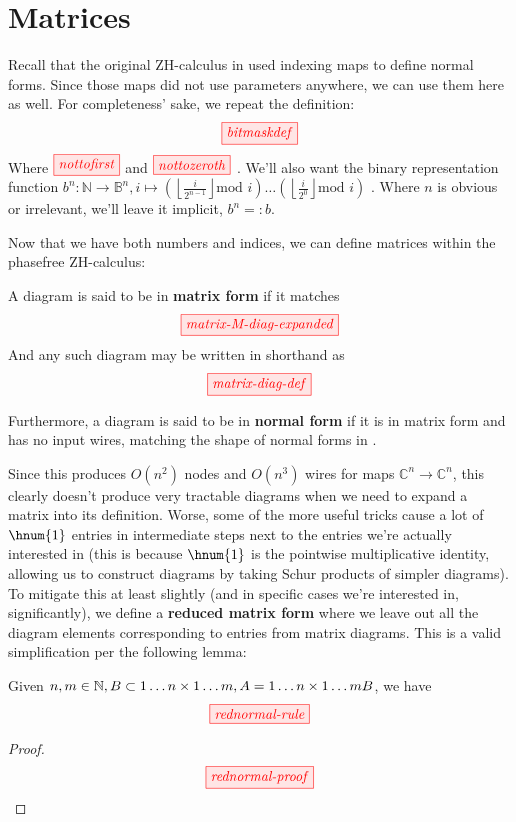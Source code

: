 \section{Matrices}\label{sec:matrices}
Recall that the original ZH-calculus in \cite{backens2018zhcalculus} used
indexing maps to define normal forms.  Since those maps did not use parameters
anywhere, we can use them here as well.  For completeness' sake, we repeat the
definition:
$$\tikzfig{bitmaskdef}$$
Where $\tikzfig{nottofirst}$ and $\tikzfig{nottozeroth}$ . We'll also want the
binary representation function 
$b^n : \mathbb{N} \rightarrow \mathbb{B}^n, i \mapsto \left( \left \lfloor
\frac{i}{2^{n-1}}\right \rfloor \text{mod } i \right) \ldots \left( \left \lfloor
\frac{i}{2^{0}}\right \rfloor \text{mod } i \right)$ . Where $n$ is obvious or
irrelevant, we'll leave it implicit, $b^n =: b$.

Now that we have both numbers and indices, we can define matrices within the
phasefree ZH-calculus:
\begin{definition}
    A diagram is said to be in \textbf{matrix form} if it matches
    $$\tikzfig{matrix-M-diag-expanded}$$
    And any such diagram may be written in shorthand as 
    $$\tikzfig{matrix-diag-def}$$

    Furthermore, a diagram is said to be in \textbf{normal form} if it is in
    matrix form and has no input wires, matching the shape of normal forms in
    \cite{backens2018zhcalculus}.
\end{definition}

Since this produces $O(n^2)$ nodes and $O(n^3)$ wires for maps $\mathbb{C}^n
\rightarrow \mathbb{C}^n$, this clearly doesn't produce very tractable diagrams
when we need to expand a matrix into its definition. Worse, some of the more
useful tricks cause a lot of $\hnum{1}$ entries in intermediate steps next to
the entries we're actually interested in (this is because $\hnum{1}$ is the
pointwise multiplicative identity, allowing us to construct diagrams by taking
Schur products of simpler diagrams). To mitigate this at least slightly (and in
specific cases we're interested in, significantly), we define a
\textbf{reduced matrix form} where we leave out all the diagram elements
corresponding to  entries from matrix diagrams. This is a valid
simplification per the following lemma:
\begin{lemma}
    Given $n,m \in \mathbb{N}, B \subset {1 \ldots n} \times {1 \ldots m}, A =
    {1 \ldots n} \times {1 \ldots m}\\B$, we have 
    $$\tikzfig{rednormal-rule}$$
\end{lemma}
\begin{proof}
    $$\tikzfig{rednormal-proof}$$
\end{proof}

